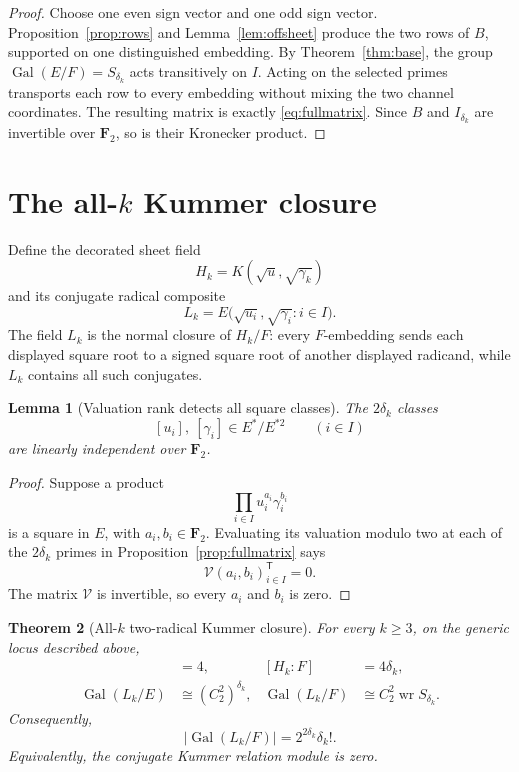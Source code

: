\documentclass[11pt,a4paper]{article}
\newtheorem{theorem}{Theorem}[section]
\newtheorem{lemma}[theorem]{Lemma}
\theoremstyle{definition}
\theoremstyle{remark}
\newcommand{\Ftwo}{\mathbf F_2}
\newcommand{\Gal}{\operatorname{Gal}}
\newcommand{\wrp}{\mathop{\mathrm{wr}}}
\begin{document}
\begin{proof}
Choose one even sign vector and one odd sign vector.  Proposition~\ref{prop:rows}
and Lemma~\ref{lem:offsheet} produce the two rows of $B$, supported on one
distinguished embedding.  By Theorem~\ref{thm:base}, the group
$\Gal(E/F)=S_{\delta_k}$ acts transitively on $I$.  Acting on the selected primes transports each row to
every embedding without mixing the two channel coordinates.  The resulting
matrix is exactly \eqref{eq:fullmatrix}.  Since $B$ and
$I_{\delta_k}$ are invertible over $\Ftwo$, so is their Kronecker product.
\end{proof}

\section{The all-\texorpdfstring{$k$}{k} Kummer closure}
\label{sec:closure}

Define the decorated sheet field
\begin{equation}
 H_k=K(\sqrt u,\sqrt{\gamma_k})
 \label{eq:H}
\end{equation}
and its conjugate radical composite
\begin{equation}
 L_k=E\bigl(\sqrt{u_i},\sqrt{\gamma_i}:i\in I\bigr).
 \label{eq:L}
\end{equation}
The field $L_k$ is the normal closure of $H_k/F$: every $F$-embedding sends
each displayed square root to a signed square root of another displayed
radicand, while $L_k$ contains all such conjugates.

\begin{lemma}[Valuation rank detects all square classes]
\label{lem:kummerrank}
The $2\delta_k$ classes
\[
 [u_i],\ [\gamma_i]\in E^*/E^{*2}\qquad(i\in I)
\]
are linearly independent over $\Ftwo$.
\end{lemma}

\begin{proof}
Suppose a product
\[
 \prod_{i\in I}u_i^{a_i}\gamma_i^{b_i}
\]
is a square in $E$, with $a_i,b_i\in\Ftwo$.  Evaluating its valuation modulo
two at each of the $2\delta_k$ primes in
Proposition~\ref{prop:fullmatrix} says
\[
 \mathcal V(a_i,b_i)_{i\in I}^{\mathsf T}=0.
\]
The matrix $\mathcal V$ is invertible, so every $a_i$ and $b_i$ is zero.
\end{proof}

\begin{theorem}[All-$k$ two-radical Kummer closure]
\label{thm:main}
For every $k\geq3$, on the generic locus described above,
\begin{align}
 [H_k:K]&=4, & [H_k:F]&=4\delta_k,\label{eq:sheetdegree}\\
 \Gal(L_k/E)&\cong(C_2^2)^{\delta_k},
 &
 \Gal(L_k/F)&\cong C_2^2\wrp S_{\delta_k}.
 \label{eq:groups}
\end{align}
Consequently,
\begin{equation}
 |\Gal(L_k/F)|=2^{2\delta_k}\delta_k!.
 \label{eq:order}
\end{equation}
Equivalently, the conjugate Kummer relation module is zero.
\end{theorem}
\end{document}
